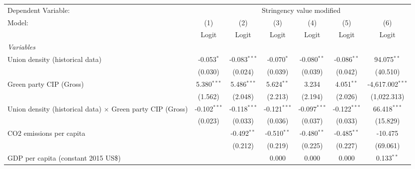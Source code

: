 
\begingroup
\centering
\begin{tabular}{lcccccc}
   \toprule
   Dependent Variable: & \multicolumn{6}{c}{Stringency value modified}\\
   Model:                                                            & (1)            & (2)            & (3)            & (4)            & (5)            & (6)\\  
                                                                     &  Logit         & Logit          & Logit          & Logit          & Logit          & Logit\\  
   \midrule
   \emph{Variables}\\
   Union density (historical data)                                   & -0.053$^{*}$   & -0.083$^{***}$ & -0.070$^{*}$   & -0.080$^{**}$  & -0.086$^{**}$  & 94.075$^{**}$\\   
                                                                     & (0.030)        & (0.024)        & (0.039)        & (0.039)        & (0.042)        & (40.510)\\   
   Green party CIP (Gross)                                           & 5.380$^{***}$  & 5.486$^{***}$  & 5.624$^{**}$   & 3.234          & 4.051$^{**}$   & -4,617.002$^{***}$\\   
                                                                     & (1.562)        & (2.048)        & (2.213)        & (2.194)        & (2.026)        & (1,022.313)\\   
   Union density (historical data) $\times$ Green party CIP (Gross)  & -0.102$^{***}$ & -0.118$^{***}$ & -0.121$^{***}$ & -0.097$^{***}$ & -0.122$^{***}$ & 66.418$^{***}$\\   
                                                                     & (0.023)        & (0.033)        & (0.036)        & (0.037)        & (0.033)        & (15.829)\\   
   CO2 emissions per capita                                          &                & -0.492$^{**}$  & -0.510$^{**}$  & -0.480$^{**}$  & -0.485$^{**}$  & -10.475\\   
                                                                     &                & (0.212)        & (0.219)        & (0.225)        & (0.227)        & (69.061)\\   
   GDP per capita (constant 2015 US\$)                               &                &                & 0.000          & 0.000          & 0.000          & 0.133$^{**}$\\   

\end{tabular}
